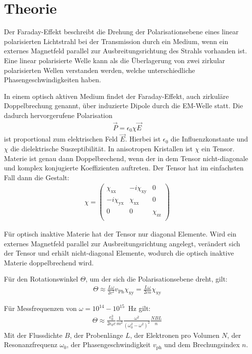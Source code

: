 \section{Theorie}
\label{sec:Theorie}

Der Faraday-Effekt beschreibt die Drehung der Polarisationsebene eines linear
polarisierten Lichtstrahl bei der Transmission durch ein Medium, wenn ein
externes Magnetfeld parallel zur Ausbreitungsrichtung des Strahls vorhanden
ist. Eine linear polarisierte Welle kann als die Überlagerung von zwei
zirkular polarisierten Wellen verstanden werden, welche unterschiedliche
Phasengeschwindigkeiten haben.

In einem optisch aktiven Medium findet der Faraday-Effekt, auch zirkuläre Doppelbrechung genannt, über induzierte
Dipole durch die EM-Welle statt. Die dadurch hervorgerufene Polarisation
\begin{align}
  \vec{P} = \epsilon_0 \chi \vec{E}
\end{align}
ist proportional zum elektrischen Feld $\vec{E}$. Hierbei ist $\epsilon_0$ die
Influenzkonstante und $\chi $ die dielektrische Suszeptibilität. In anisotropen
Kristallen ist $\chi$ ein Tensor. Materie ist genau dann Doppelbrechend, wenn der in dem
Tensor nicht-diagonale und komplex konjugierte Koeffizienten auftreten. Der Tensor
hat im einfachsten Fall dann die Gestalt:
\begin{align}
  \chi =
  \left( \begin{matrix}
         \chi_{\mathrm{xx}} & -i \chi_{\mathrm{xy}} & 0 \\
         -i \chi_{\mathrm{yx}} & \chi_{\mathrm{xx}} & 0 \\
         0 & 0 & \chi_{\mathrm{zz}}  \\
  \end{matrix} \right)
\end{align}

Für optisch inaktive Materie hat der Tensor nur diagonal Elemente. Wird ein
externes Magnetfeld parallel zur Ausbreitungsrichtung angelegt, verändert sich der Tensor und erhält
nicht-diagonal Elemente, wodurch die optisch inaktive Materie doppelbrechend wird.

Für den Rotationswinkel $\Theta$, um der sich die Polarisationsebene dreht, gilt:
\begin{align}
  \Theta \approx \frac{L \omega}{2 c^2}v_{\mathrm{Ph}} \chi_{\mathrm{xy}} = \frac{L \omega}{2 c n}\chi_{\mathrm{xy}}
\end{align}

Für Messfrequenzen von $\omega = 10^{14}-10^{15}$\, Hz gilt:
\begin{align}
  \Theta \approx \frac{e^3_0}{2 \epsilon_0 c} \frac{1}{m^2}\frac{\omega^2}{(\omega^2_0 - \omega^2)^2} \frac{NBL}{n} \label{eqn:theta}
\end{align}
Mit der Flussdichte $B$, der Probenlänge $L$, der Elektronen pro Volumen $N$, der Resonanzfrequenz $\omega_0$,
der Phasengeschwindigkeit $v_{\mathrm{ph}}$ und dem Brechungsindex $n$.

